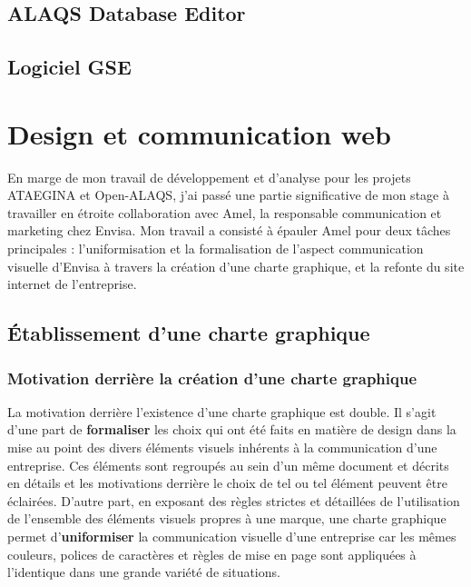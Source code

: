 \documentclass[a4paper,12pt,twoside]{article}
\begin{document}
    \subsection{ALAQS Database Editor}
    \subsection{Logiciel GSE}
    \newpage
    
    \section{Design et communication web}
    En marge de mon travail de développement et d'analyse pour les projets \gls{ATAEGINA} et \gls{Open-ALAQS}, j'ai passé une partie significative de mon stage à travailler en étroite collaboration avec Amel, la responsable communication et marketing chez Envisa. Mon travail a consisté à épauler Amel pour deux tâches principales : l'uniformisation et la formalisation de l'aspect communication visuelle d'Envisa à travers la création d'une charte graphique, et la refonte du site internet de l'entreprise.
    \subsection{Établissement d'une charte graphique}
    \subsubsection{Motivation derrière la création d'une charte graphique}
    La motivation derrière l'existence d'une charte graphique est double. Il s'agit d'une part de \textbf{formaliser} les choix qui ont été faits en matière de design dans la mise au point des divers éléments visuels inhérents à la communication d'une entreprise. Ces éléments sont regroupés au sein d'un même document et décrits en détails et les motivations derrière le choix de tel ou tel élément peuvent être éclairées. D'autre part, en exposant des règles strictes et détaillées de l'utilisation de l'ensemble des éléments visuels propres à une marque, une charte graphique permet d'\textbf{uniformiser} la communication visuelle d'une entreprise car les mêmes couleurs, polices de caractères et règles de mise en page sont appliquées à l'identique dans une grande variété de situations.
\end{document}
